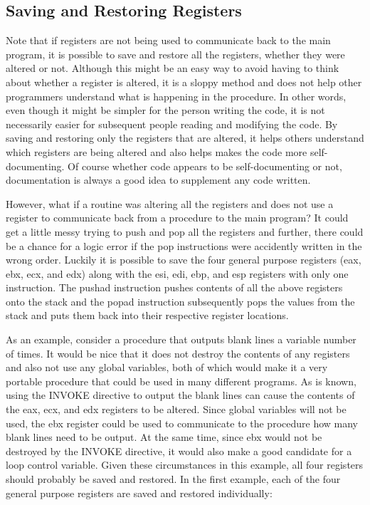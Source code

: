 \documentclass[10pt]{book}
\begin{document}
\subsection{Saving and Restoring Registers}
Note that if registers are not being used to communicate back to the main program, it is possible to save and restore all the registers, whether they were altered or not. Although this might be an easy way to avoid having to think about whether a register is altered, it is a sloppy method and does not help other programmers understand what is happening in the procedure. In other words, even though it might be simpler for the person writing the code, it is not necessarily easier for subsequent people reading and modifying the code. By saving and restoring only the registers that are altered, it helps others understand which registers are being altered and also helps makes the code more self-documenting. Of course whether code appears to be self-documenting or not, documentation is always a good idea to supplement any code written.

However, what if a routine was altering all the registers and does not use a register to communicate back from a procedure to the main program? It could get a little messy trying to push and pop all the registers and further, there could be a chance for a logic error if the pop instructions were accidently written in the wrong order. Luckily it is possible to save the four general purpose registers (eax, ebx, ecx, and edx) along with the esi, edi, ebp, and esp registers with only one instruction. The pushad instruction pushes contents of all the above registers onto the stack and the popad instruction subsequently pops the values from the stack and puts them back into their respective register locations.

As an example, consider a procedure that outputs blank lines a variable number of times. It would be nice that it does not destroy the contents of any registers and also not use any global variables, both of which would make it a very portable procedure that could be used in many different programs. As is known, using the INVOKE directive to output the blank lines can cause the contents of the eax, ecx, and edx registers to be altered. Since global variables will not be used, the ebx register could be used to communicate to the procedure how many blank lines need to be output. At the same time, since ebx would not be destroyed by the INVOKE directive, it would also make a good candidate for a loop control variable. Given these circumstances in this example, all four registers should probably be saved and restored. In the first example, each of the four general purpose registers are saved and restored individually:
\end{document}
